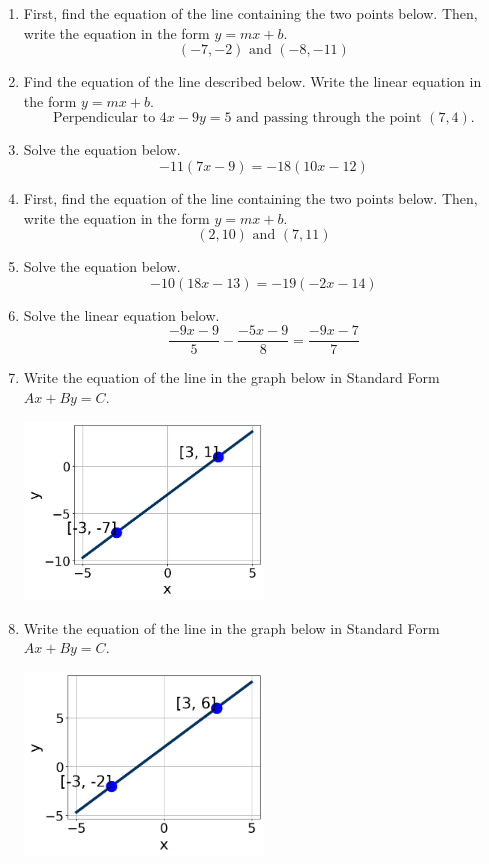 \documentclass[14pt]{extbook}
\begin{document}
\begin{enumerate}
\item{
First, find the equation of the line containing the two points below. Then, write the equation in the form $ y=mx+b $.\[ (-7, -2) \text{ and } (-8, -11) \]} \newpage
\item{
Find the equation of the line described below. Write the linear equation in the form $y=mx+b$.\[ \text{Perpendicular to } 4 x - 9 y = 5 \text{ and passing through the point } (7, 4). \]} \newpage
\item{
Solve the equation below.\[ -11(7x -9) = -18(10x -12) \]} \newpage
\item{
First, find the equation of the line containing the two points below. Then, write the equation in the form $ y=mx+b $.\[ (2, 10) \text{ and } (7, 11) \]} \newpage
\item{
Solve the equation below.\[ -10(18x -13) = -19(-2x -14) \]} \newpage
\item{
Solve the linear equation below.\[ \frac{-9x -9}{5} - \frac{-5x -9}{8} = \frac{-9x -7}{7} \]} \newpage
\item{
Write the equation of the line in the graph below in Standard Form $Ax+By=C$.
\begin{center}
    \includegraphics[width=0.5\textwidth]{../Figures/linearGraphToStandardA.png}
\end{center}
} \newpage
\item{
Write the equation of the line in the graph below in Standard Form $Ax+By=C$.
\begin{center}
    \includegraphics[width=0.5\textwidth]{../Figures/linearGraphToStandardCopyA.png}

\end{center}}
\end{enumerate}
\end{document}
